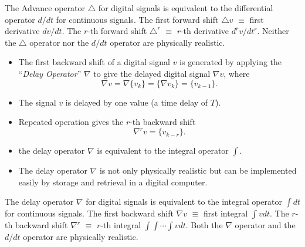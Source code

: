 The Advance operator $\triangle$ for digital signals is equivalent to the
differential operator $d/dt$ for continuous signals. The first forward
shift $\triangle v$ $\equiv$ first derivative $dv/dt$. The $r$-th
forward shift $\triangle^r$ $\equiv$ $r$-th derivative $d^rv/dt^r$. Neither the $\triangle$ operator nor the $d/dt$ operator are
physically realistic.

\begin{slide}
  \label{slide:l7s5}
\begin{itemize}

\item   The first backward shift of a digital signal $v$ is generated by
  applying the ``\emph{Delay Operator}'' $\nabla$  to give the
  delayed  digital signal $\nabla v$, where \[ \nabla v = \nabla
  \{v_k\} = \{\nabla v_k\} = \{v_{k-1}\}.\]


\item   The signal $v$ is delayed by one value (a time delay of
  $T$).


\item   Repeated operation gives the $r$-th backward shift \[ \nabla^r v = \{v_{k-r}\}.\]

\item the delay operator $\nabla$ is equivalent to the integral operator
  $\int$.

\item   The delay operator $\nabla$ is not only physically realistic
  but can be implemented easily by storage and retrieval in a digital
  computer.

\end{itemize}
\end{slide}

The delay operator $\nabla$ for digital signals is equivalent to the
integral operator $\int dt$ for continuous signals. The first backward
shift $\nabla v$ $\equiv$ first integral $\int v dt$. The $r$-th
backward shift $\nabla^r$ $\equiv$ $r$-th integral $\int \int \cdots
\int v dt$. Both the $\nabla$ operator and the $d/dt$ operator are
physically realistic.

